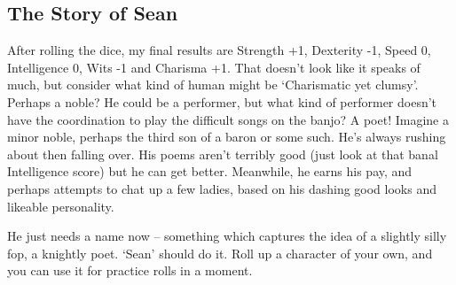 \begin{figure*}[b!]

\begin{boxtext}

\subsection{The Story of Sean}

After rolling the dice, my final results are Strength +1, Dexterity -1, Speed 0, Intelligence 0, Wits -1 and Charisma +1.
That doesn't look like it speaks of much, but consider what kind of human might be `Charismatic yet clumsy'.
Perhaps a noble?
He could be a performer, but what kind of performer doesn't have the coordination to play the difficult songs on the banjo?
A poet!
Imagine a minor noble, perhaps the third son of a baron or some such.
He's always rushing about then falling over.
His poems aren't terribly good (just look at that banal Intelligence score) but he can get better.
Meanwhile, he earns his pay, and perhaps attempts to chat up a few ladies, based on his dashing good looks and likeable personality.

He just needs a name now -- something which captures the idea of a slightly silly fop, a knightly poet.
`Sean' should do it.
Roll up a character of your own, and you can use it for practice rolls in a moment.

\end{boxtext}

\end{figure*}
